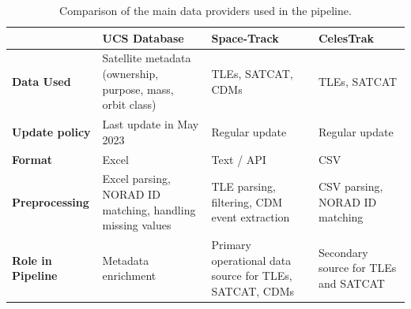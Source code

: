 

\begin{table}[H]
    \centering
    \caption{Comparison of the main data providers used in the pipeline.}
    \label{tab:datasets}
    
    \begin{tabularx}{\textwidth}{@{}p{2.5cm}XXX@{}}
        \toprule
        & \textbf{UCS Database} & \textbf{Space-Track} & \textbf{CelesTrak} \\
        \midrule
        
        \textbf{Data Used} 
        & Satellite metadata (ownership, purpose, mass, orbit class) 
        & TLEs, SATCAT, CDMs 
        & TLEs, SATCAT \\
        
        \textbf{Update policy} 
        & Last update in May 2023
        & Regular update
        & Regular update \\
        
        \textbf{Format} 
        & Excel 
        & Text / API 
        & CSV \\
        
        \textbf{Preprocessing} 
        & Excel parsing, NORAD ID matching, handling missing values
        & TLE parsing, filtering, CDM event extraction 
        & CSV parsing, NORAD ID matching \\
        
        \textbf{Role in Pipeline} 
        & Metadata enrichment
        & Primary operational data source for TLEs, SATCAT, CDMs
        & Secondary source for TLEs and SATCAT \\
        
        \bottomrule
    \end{tabularx}
\end{table}



